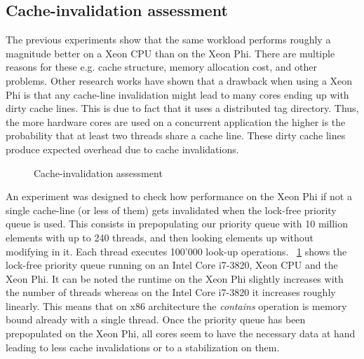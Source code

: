 \subsection{Cache-invalidation assessment}
The previous experiments show that the same workload performs roughly a magnitude better on a Xeon CPU than on the Xeon Phi. There are multiple reasons for these e.g. cache structure, memory allocation cost, and other problems.
Other research works have shown that a drawback when using a Xeon Phi is that any cache-line invalidation might lead to many cores ending up with dirty cache lines. This is due to fact that it uses a distributed tag directory. Thus, the more hardware cores are used on a concurrent application the higher is the probability that at least two threads share a cache line. These dirty cache lines produce expected overhead due to cache invalidations.\\

\begin{figure}[t]
	\centering
	
	\caption{Cache-invalidation assessment}
	\label{fig:comp_contains}
\end{figure}

An experiment was designed to check how performance on the Xeon Phi if not a single cache-line (or less of them) gets invalidated when the lock-free priority queue is used. This consists in prepopulating our priority queue with 10 million elements with up to 240 threads, and then looking elements up without modifying in it. Each thread executes 100'000 look-up operations. \figurename~\ref{fig:comp_contains}  shows the lock-free priority queue running on an Intel Core i7-3820, Xeon CPU and the Xeon Phi. It can be noted the runtime on the Xeon Phi slightly increases with the number of threads whereas on the Intel Core i7-3820 it increases roughly linearly. This means that on x86 architecture the \textit{contains} operation is memory bound already with a single thread. Once the priority queue has been prepopulated on the Xeon Phi, all cores seem to have the necessary data at hand leading to less cache invalidations or to a stabilization on them.\\

